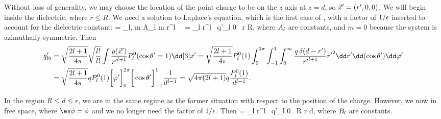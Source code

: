 \begin{solution}
	Without loss of generality, we may choose the location of the point charge to be on the $z$ axis at $z = d$, so $\vec{x}' = (r', 0, 0)$.  We will begin inside the dielectric, where $r \leq R$.  We need a solution to Laplace's equation, which is the first case of , with a factor of $1/\epsilon$ inserted to account for the dielectric constant:
	\beqn \label{A}
		\evphix = \fe \sum_{l, m} A_{l m}  r^l \, \qplm \, \Ylm\tv
		= \fe \sum_l \Al {} r^l \, q'_{l 0} \, \Ylotv \quad \tif r \leq R,
	\eeqn
	where $A_l$ are constants, and $m = 0$ because the system is azimuthally symmetric.  Then
	\begin{align*}
		q'_{l 0} &= \sqrt{\frac{2l + 1}{4\pi}} \sqrt{\frac{l!}{l!}} \int \frac{\rhoxp}{{r'}^{l+1}} P_l^0(\cost' = 1) \dcxp
		= \sqrt{\frac{2l + 1}{4\pi}} \Ploq \intotp \intono \intoi \frac{q \, \delta(d - r')}{{r'}^{l+1}} {r'}^2 \drp \dctp \dvp \\
		&= \sqrt{\frac{2l + 1}{4\pi}} q \Ploq \bigg[ \vph' \bigg]_0^{2\pi} \bigg[ \cost' \bigg]_{-1}^1 \frac{1}{d^{l-1}}
		= \sqrt{4\pi (2l + 1)} q \frac{\Ploq}{d^{l-1}}.
	\end{align*}
	
	In the region $R \leq d \leq r$, we are in the same regime as the former situation with respect to the position of the charge.  However, we now in free space, where $\ev\phi = \phi$ and we no longer need the factor of $1/\epsilon$.  Then
	\beqn \label{B}
		\phix = \sum_l \Bl {} r^l \, q'_{l 0} \, \Ylotv \quad \tif R \leq r \leq d,
	\eeqn
	where $B_l$ are constants.
	

\end{solution}
